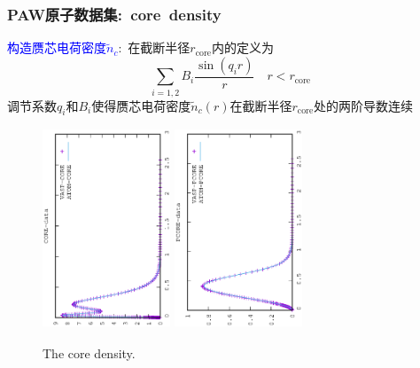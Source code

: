 \frame
{
	\frametitle{\textrm{PAW}原子数据集:~\textrm{core~density}}
	\textcolor{blue}{构造赝芯电荷密度$\tilde n_c$}:~在截断半径$r_{\mathrm{core}}$内的定义为
	$$\sum_{i=1,2}B_i\dfrac{\sin(q_ir)}r\quad r<r_{\mathrm{core}}$$
	调节系数$q_i$和$B_i$使得赝芯电荷密度$\tilde n_c(r)$在截断半径$r_{\mathrm{core}}$处的两阶导数连续
\begin{figure}[h!]
\vskip -0.5in
\centering
\hspace*{-0.1in}
\includegraphics[width=1.5in,height=2.35in,viewport=0 0 350 550, angle=-90, clip]{Figures/CORE-data.eps}
\hspace*{-0.7in}
\includegraphics[height=2.35in,width=1.5in,viewport=0 0 350 550, angle=-90, clip]{Figures/PCORE-data.eps}
\caption{\tiny \textrm{The core density.}}%
\label{core_density_Function}
\end{figure}
}

